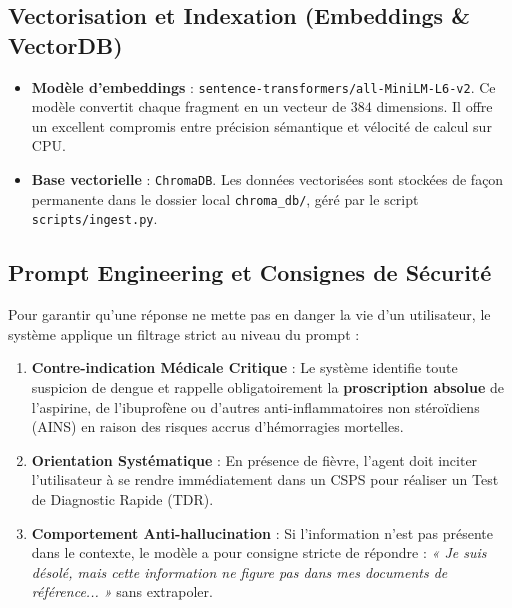 \documentclass[12pt,a4paper]{article}
\begin{document}
\subsection{Vectorisation et Indexation (Embeddings \& VectorDB)}
\begin{itemize}
    \item \textbf{Modèle d'embeddings} : \texttt{sentence-transformers/all-MiniLM-L6-v2}. Ce modèle convertit chaque fragment en un vecteur de $384$ dimensions. Il offre un excellent compromis entre précision sémantique et vélocité de calcul sur CPU.
    \item \textbf{Base vectorielle} : \texttt{ChromaDB}. Les données vectorisées sont stockées de façon permanente dans le dossier local \texttt{chroma\_db/}, géré par le script \texttt{scripts/ingest.py}.
\end{itemize}

\subsection{Prompt Engineering et Consignes de Sécurité}
Pour garantir qu'une réponse ne mette pas en danger la vie d'un utilisateur, le système applique un filtrage strict au niveau du prompt :
\begin{enumerate}
    \item \textbf{Contre-indication Médicale Critique} : Le système identifie toute suspicion de dengue et rappelle obligatoirement la \textbf{proscription absolue} de l'aspirine, de l'ibuprofène ou d'autres anti-inflammatoires non stéroïdiens (AINS) en raison des risques accrus d'hémorragies mortelles.
    \item \textbf{Orientation Systématique} : En présence de fièvre, l'agent doit inciter l'utilisateur à se rendre immédiatement dans un CSPS pour réaliser un Test de Diagnostic Rapide (TDR).
    \item \textbf{Comportement Anti-hallucination} : Si l'information n'est pas présente dans le contexte, le modèle a pour consigne stricte de répondre : \textit{« Je suis désolé, mais cette information ne figure pas dans mes documents de référence... »} sans extrapoler.
\end{enumerate}
\end{document}
